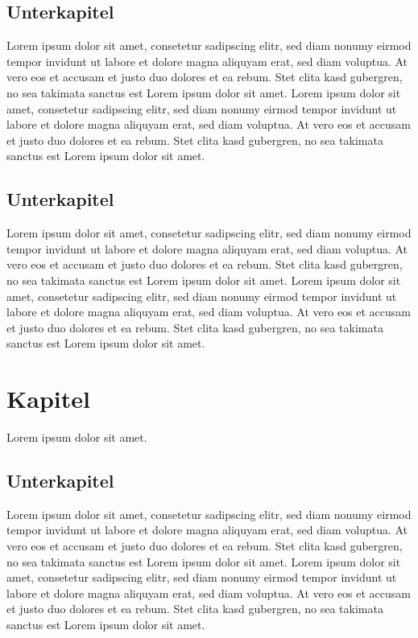 \subsection{Unterkapitel}
Lorem ipsum dolor sit amet, consetetur sadipscing elitr, sed diam nonumy eirmod tempor invidunt ut labore et dolore magna aliquyam erat, sed diam voluptua. At vero eos et accusam et justo duo dolores et ea rebum. Stet clita kasd gubergren, no sea takimata sanctus est Lorem ipsum dolor sit amet. Lorem ipsum dolor sit amet, consetetur sadipscing elitr, sed diam nonumy eirmod tempor invidunt ut labore et dolore magna aliquyam erat, sed diam voluptua. At vero eos et accusam et justo duo dolores et ea rebum. Stet clita kasd gubergren, no sea takimata sanctus est Lorem ipsum dolor sit amet.

\subsection{Unterkapitel}
Lorem ipsum dolor sit amet, consetetur sadipscing elitr, sed diam nonumy eirmod tempor invidunt ut labore et dolore magna aliquyam erat, sed diam voluptua. At vero eos et accusam et justo duo dolores et ea rebum. Stet clita kasd gubergren, no sea takimata sanctus est Lorem ipsum dolor sit amet. Lorem ipsum dolor sit amet, consetetur sadipscing elitr, sed diam nonumy eirmod tempor invidunt ut labore et dolore magna aliquyam erat, sed diam voluptua. At vero eos et accusam et justo duo dolores et ea rebum. Stet clita kasd gubergren, no sea takimata sanctus est Lorem ipsum dolor sit amet.
\pagebreak

\section{Kapitel}
Lorem ipsum dolor sit amet.

\subsection{Unterkapitel}
Lorem ipsum dolor sit amet, consetetur sadipscing elitr, sed diam nonumy eirmod tempor invidunt ut labore et dolore magna aliquyam erat, sed diam voluptua. At vero eos et accusam et justo duo dolores et ea rebum. Stet clita kasd gubergren, no sea takimata sanctus est Lorem ipsum dolor sit amet. Lorem ipsum dolor sit amet, consetetur sadipscing elitr, sed diam nonumy eirmod tempor invidunt ut labore et dolore magna aliquyam erat, sed diam voluptua. At vero eos et accusam et justo duo dolores et ea rebum. Stet clita kasd gubergren, no sea takimata sanctus est Lorem ipsum dolor sit amet.

